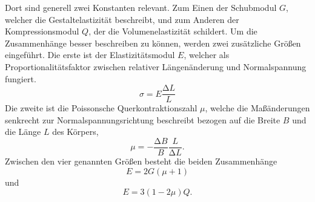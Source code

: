 Dort sind generell zwei Konstanten relevant.
Zum Einen der Schubmodul $G$, welcher die Gestaltelastizität beschreibt, und zum Anderen der Kompressionsmodul $Q$, der die Volumenelastizität schildert.
Um die Zusammenhänge besser beschreiben zu können, werden zwei zusätzliche Größen eingeführt.
Die erste ist der Elastizitätsmodul $E$, welcher als Proportionalitätsfaktor zwischen relativer Längenänderung und Normalspannung fungiert.
\begin{equation}
  \sigma = E \frac{\increment L}{L}
\end{equation}
Die zweite ist die Poissonsche Querkontraktionszahl $\mu$, welche die Maßänderungen senkrecht zur Normalspannungsrichtung beschreibt bezogen auf die Breite $B$ und die Länge $L$ des Körpers,
\begin{equation}
  \mu = - \frac{\increment B}{B} \frac{L}{\increment L}.
\end{equation}
Zwischen den vier genannten Größen besteht die beiden Zusammenhänge
\begin{equation}
  E = 2G(\mu+1) \label{eqn:1}
\end{equation}
und
\begin{equation}
  E = 3(1-2\mu)Q. \label{eqn:2}    %
\end{equation}
